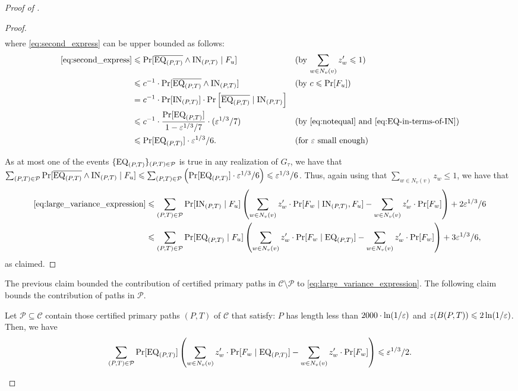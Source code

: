\begin{proof}[Proof of ]
\begin{proof}
\begin{align}
		\end{align}
		where \eqref{eq:second_express} can be upper bounded as follows: 
		\begin{align*}
		\eqref{eq:second_express} & \leqslant \Pr[\overline{\mathrm{EQ}_{(P,T)}} \wedge \mathrm{IN}_{(P,T)} \mid F_u] && \text{(by $\sum_{w\in N_v(v)} z'_w \leqslant 1$)}\\
		 & \leqslant c^{-1}\cdot \Pr[\overline{\mathrm{EQ}_{(P,T)}} \wedge \mathrm{IN}_{(P,T)} ] && \text{(by $c\leqslant \Pr[F_u]$)}\\
		 & = c^{-1}\cdot \Pr[\mathrm{IN}_{(P,T)}  ] \cdot \Pr\left[\overline{\mathrm{EQ}_{(P,T)}}\mid \mathrm{IN}_{(P,T)}\right]\\
		 & \leqslant c^{-1}\cdot \frac{\Pr[\mathrm{EQ}_{(P,T)} ]}{1-\varepsilon^{1/3}/7}\cdot (\varepsilon^{1/3}/7) && \text{(by \eqref{eq:notequal} and \eqref{eq:EQ-in-terms-of-IN})}\\
		 & \leqslant \Pr[\mathrm{EQ}_{(P,T)}] \cdot \varepsilon^{1/3}/6. && \text{(for $\varepsilon$ small enough)}
		\end{align*}
		
		As at most one of the events $\{\mathrm{EQ}_{(P,T)}\}_{(P,T) \in \mathcal{P}}$ is true in any realization of $G_\tau$, we have that $\sum_{(P,T) \in \mathcal{P}} \Pr[\overline{\mathrm{EQ}_{(P,T)}} \wedge \mathrm{IN}_{(P,T)} \mid F_u] \leqslant \sum_{(P,T) \in \mathcal{P}} \left( \Pr[\mathrm{EQ}_{(P,T)}] \cdot \varepsilon^{1/3}/6\right) \leqslant \varepsilon^{1/3}/6$.
		Thus, again using that $\sum_{w\in N_v(v)} z_w \leq 1$, we have that
		\begin{align*}
		\eqref{eq:large_variance_expression} &\leqslant 
		\sum_{(P,T)\in \mathcal{P}}\Pr[\mathrm{IN}_{(P,T)} \mid F_u] \left(\sum_{w\in N_v(v)} z'_w \cdot \Pr[F_w \mid \mathrm{IN}_{(P,T)}, F_u] - \sum_{w\in N_v(v)} z'_w \cdot \Pr[F_w] \right) + 2\varepsilon^{1/3}/6  \\
		& \leqslant \sum_{(P,T)\in \mathcal{P}}\Pr[\mathrm{EQ}_{(P,T)} \mid F_u] \left(\sum_{w\in N_v(v)} z'_w \cdot \Pr[F_w \mid \mathrm{EQ}_{(P,T)}] - \sum_{w\in N_v(v)} z'_w \cdot \Pr[F_w] \right) + 3\varepsilon^{1/3}/6,
		\end{align*}
		as claimed.    
	\end{proof}


	The previous claim bounded the contribution of certified primary paths in $\mathcal{C}\setminus \mathcal{P}$ to \eqref{eq:large_variance_expression}. The following claim bounds the contribution of paths in $\mathcal{P}$.
	\begin{claim}\label{claim:bound-for-EQ}
		Let $\mathcal{P} \subseteq \mathcal{C}$ contain those certified primary paths $(P, T)$ of $\mathcal{C}$ that satisfy:  $P$ has length less than $2000 \cdot \ln(1/\varepsilon)$ and  $z(B(P, T)) \leqslant 2\ln(1/\varepsilon)$. Then, we have
		\begin{align*}
		\sum_{(P,T)\in \mathcal{P}}\Pr[\mathrm{EQ}_{(P,T)}] \left(\sum_{w\in N_v(v)} z'_w \cdot \Pr[F_w \mid \mathrm{EQ}_{(P,T)}] - \sum_{w\in N_v(v)} z'_w \cdot \Pr[F_w] \right)\leqslant \varepsilon^{1/3}/2.
		\end{align*}
	\end{claim}
	

\end{proof}
